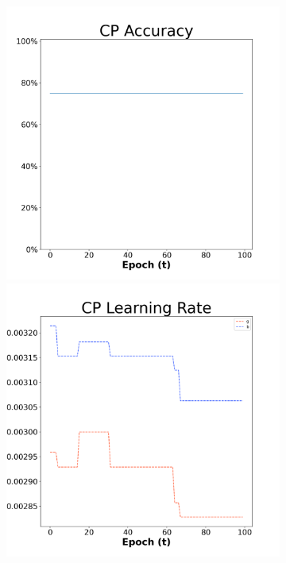 \begin{figure}[H]
    \centering %
\begin{subfigure}{0.3\textwidth}
  \includegraphics[width=\linewidth]{images/exper1/Ionosphere/CP_0.01_acc.png}
    \includegraphics[width=\linewidth]{images/exper1/Ionosphere/CP_0.01_lr.png}

\end{subfigure}
\end{figure}
